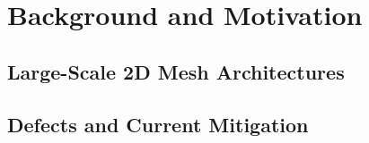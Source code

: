 \documentclass[sigconf, screen, review]{acmart}
\begin{document}
\section{Background and Motivation}
\label{sec:background}

\subsection{Large-Scale 2D Mesh Architectures}
\label{sec:bg-arch}



\subsection{Defects and Current Mitigation}
\label{sec:bg-defect}


\end{document}
